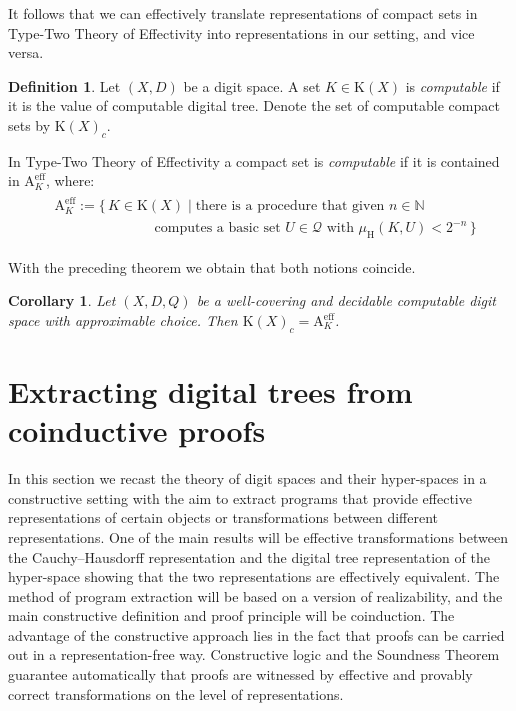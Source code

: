 \documentclass[microtype]{jloganal}
\theoremstyle{plain}
\newtheorem{corollary}[theorem]{Corollary}
\theoremstyle{definition}
\newtheorem{definition}[theorem]{Definition}
\newcommand{\NN}{\mathbb{N}}
\newcommand{\QQQ}{\mathcal{Q}}
\newcommand{\compact}{\mathrm{K}}
\newcommand{\hdm}{\mu_{\mathrm H}}
\newcommand{\cauchy}{\mathrm{A}}
\begin{document}
It follows that we can effectively translate representations of compact 
sets in Type-Two Theory of Effectivity into representations in our setting, and vice versa.

\begin{definition}
\label{def-computable-compact}
Let $(X,D)$ be a digit space. A set $K\in\compact(X)$ is \emph{computable}
if it is the value of computable digital tree. Denote the set of computable compact sets by $\compact(X)_c$.
\end{definition}


In Type-Two Theory of Effectivity a compact set is \emph{computable} if it is contained in $\cauchy^\text{eff}_K$, where:
\begin{gather*}
\begin{split}
&\cauchy^\text{eff}_K := \{\, K \in \compact(X) \mid \text{there is a procedure that given $n \in \NN$}\\
&\hspace{3cm} \text{computes a basic set $U \in \QQQ$ with $\hdm(K, U) < 2^{-n}$} \,\}
\end{split}
\end{gather*}

With the preceding theorem we obtain that both notions coincide.

\begin{corollary}\label{cor-tte-tree}
Let $(X, D, Q)$ be a well-covering and decidable computable digit space with approximable choice. Then $\compact(X)_c = \cauchy^\text{eff}_K$.
\end{corollary} 



\section{Extracting digital trees from coinductive proofs}
\label{sec-coind}
In this section we recast the theory of digit spaces and their hyper-spaces
in a constructive setting with the aim to extract programs that provide
effective representations of certain objects or transformations 
between different representations.
One of the main results will be effective transformations between
the Cauchy--Hausdorff representation and the digital tree representation
of the hyper-space showing that the two representations are effectively
equivalent.
The method of program extraction will be based on a version of realizability,
and the main constructive definition and proof principle will be coinduction.
The advantage of the constructive approach lies in the fact that proofs can be
carried out in a representation-free way. Constructive logic and the Soundness
Theorem guarantee automatically that proofs are witnessed by effective and
provably correct transformations on the level of representations.
\end{document}

